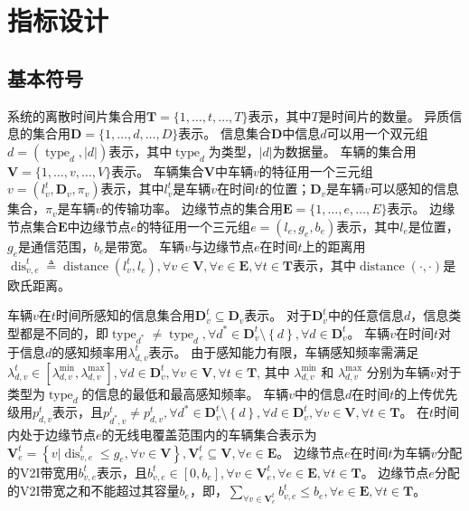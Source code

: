 \section{指标设计}\label{section 3-3}

\subsection{基本符号}

系统的离散时间片集合用$\mathbf{T}=\{1, \ldots, t, \ldots, T\}$表示，其中$T$是时间片的数量。
异质信息的集合用$\mathbf{D}=\{1, \ldots, d, \ldots, D\}$表示。
信息集合$\mathbf{D}$中信息$d$可以用一个双元组$d=\left(\operatorname{type}_d, \left|d\right| \right)$表示，其中$\operatorname{type}_d$为类型，$\left|d\right|$为数据量。
车辆的集合用$\mathbf{V}=\{1, \ldots, v, \ldots, V\}$表示。
车辆集合$\mathbf{V}$中车辆$v$的特征用一个三元组$v=\left (l_v^t, \mathbf{D}_v, \pi_v \right )$表示，其中$l_v^t$是车辆$v$在时间$t$的位置；$\mathbf{D}_v$是车辆$v$可以感知的信息集合，$\pi_v$是车辆$v$的传输功率。
边缘节点的集合用$\mathbf{E}=\{1, \ldots, e, \ldots, E\}$表示。
边缘节点集合$\mathbf{E}$中边缘节点$e$的特征用一个三元组$e=\left (l_e, g_e, b_e \right)$表示，其中$l_e$是位置，$g_e$是通信范围，$b_e$是带宽。
车辆$v$与边缘节点$e$在时间$t$上的距离用$\operatorname{dis}_{v,e}^t \triangleq \operatorname{distance} \left (l_v^t, l_e \right ), \forall v \in \mathbf{V}, \forall e \in \mathbf{E}, \forall t \in \mathbf{T}$表示，其中$\operatorname{distance}\left(\cdot,\cdot\right)$是欧氏距离。

车辆$v$在$t$时间所感知的信息集合用$\mathbf{D}_v^t\subseteq \mathbf{D}_v$表示。
对于$\mathbf{D}_v^t$中的任意信息$d$，信息类型都是不同的，即$\operatorname{type}_{d^*} \neq \operatorname{type}_{d}, \forall d^* \in \mathbf{D}_v^t \setminus \left\{ d\right \}, \forall d \in \mathbf{D}_v^t$。
车辆$v$在时间$t$对于信息$d$的感知频率用$\lambda_{d,v}^t$表示。
由于感知能力有限，车辆感知频率需满足$\lambda_{d,v}^{t} \in [\lambda_{d,v}^{\min} , \lambda_{d,v}^{\max} ], \forall d \in \mathbf{D}_v^t, \forall v \in \mathbf{V}, \forall t \in \mathbf{T}$, 其中 $\lambda_{d,v}^{\min}$ 和 $\lambda_{d,v}^{\max}$ 分别为车辆$v$对于类型为$\operatorname{type}_{d}$的信息的最低和最高感知频率。
车辆$v$中的信息$d$在时间$t$的上传优先级用$p_{d,v}^t$表示，且${p}_{d^*, v}^t \neq {p}_{d, v}^t, \forall d^* \in \mathbf{D}_v^t \setminus \left\{ d\right \}, \forall d \in \mathbf{D}_v^t, \forall v \in \mathbf{V}, \forall t \in \mathbf{T}$。
在$t$时间内处于边缘节点$e$的无线电覆盖范围内的车辆集合表示为$\mathbf{V}_e^t=\left \{v \vert \operatorname{dis}_{v,e}^t \leq g_e, \forall v \in \mathbf{V} \right \}, \mathbf{V}_e^t \subseteq \mathbf{V}, \forall e \in \mathbf{E}$。
边缘节点$e$在时间$t$为车辆$v$分配的V2I带宽用$b_{v, e}^t$表示，且$b_{v, e}^t \in \left [0,b_e \right], \forall v \in \mathbf{V}_e^{t}, \forall e \in \mathbf{E}, \forall t \in \mathbf{T}$。
边缘节点$e$分配的V2I带宽之和不能超过其容量$b_e$，即，${\sum_{\forall v \in \mathbf{V}_e^{t}}b_{v, e}^t} \leq b_e, \forall e \in \mathbf{E}, \forall t \in \mathbf{T}$。

